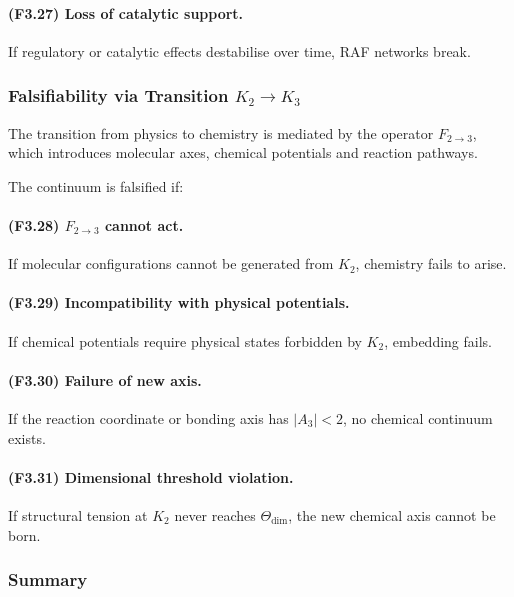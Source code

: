 \paragraph{(F3.27) Loss of catalytic support.}
If regulatory or catalytic effects destabilise over time, RAF networks
break.



\subsubsection{Falsifiability via Transition \texorpdfstring{$K_2 \to K_3$}{K_2 \to K_3}}

The transition from physics to chemistry is mediated by the operator
$F_{2\to 3}$, which introduces molecular axes, chemical potentials and
reaction pathways.

The continuum is falsified if:

\paragraph{(F3.28) $F_{2\to 3}$ cannot act.}
If molecular configurations cannot be generated from $K_2$, chemistry
fails to arise.

\paragraph{(F3.29) Incompatibility with physical potentials.}
If chemical potentials require physical states forbidden by $K_2$,
embedding fails.

\paragraph{(F3.30) Failure of new axis.}
If the reaction coordinate or bonding axis has $|A_3| < 2$,
no chemical continuum exists.

\paragraph{(F3.31) Dimensional threshold violation.}
If structural tension at $K_2$ never reaches
$\Theta_{\mathrm{dim}}$, the new chemical axis cannot be born.



\subsubsection{Summary}


